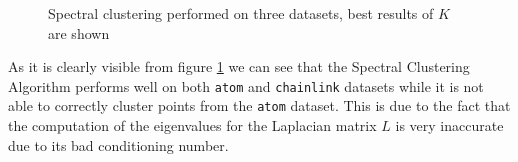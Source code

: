 \begin{figure}[H]
    \caption{Spectral clustering performed on three datasets, best results of \(K\) are shown}
    \label{SpectralClustering_3d}
\end{figure}

\noindent As it is clearly visible from figure \ref{SpectralClustering_3d} we can see that the Spectral Clustering Algorithm performs well on both \texttt{atom} and \texttt{chainlink} datasets while it is not able to correctly cluster points from the \texttt{atom} dataset. This is due to the fact that the computation of the eigenvalues for the Laplacian matrix \(L\) is very inaccurate due to its bad conditioning number.


